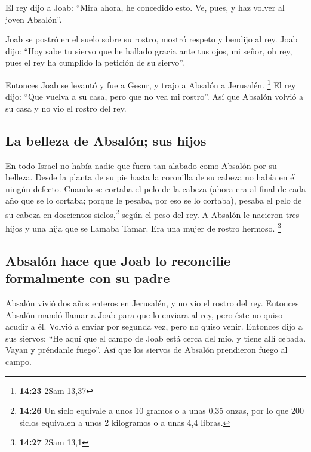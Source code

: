\begin{paracol}{2}
 El rey dijo a Joab: ``Mira ahora, he concedido esto. Ve,
pues, y haz volver al joven Absalón''.

 Joab se postró en el suelo sobre su rostro, mostró
respeto y bendijo al rey. Joab dijo: ``Hoy sabe tu siervo que he hallado
gracia ante tus ojos, mi señor, oh rey, pues el rey ha cumplido la
petición de su siervo''.

 Entonces Joab se levantó y fue a Gesur, y trajo a
Absalón a Jerusalén. \footnote{\textbf{14:23} 2Sam 13,37}
 El rey dijo: ``Que vuelva a su casa, pero que no vea mi
rostro''. Así que Absalón volvió a su casa y no vio el rostro del rey.

\hypertarget{la-belleza-de-absaluxf3n-sus-hijos}{%
\subsection{La belleza de Absalón; sus
hijos}\label{la-belleza-de-absaluxf3n-sus-hijos}}

 En todo Israel no había nadie que fuera tan alabado como
Absalón por su belleza. Desde la planta de su pie hasta la coronilla de
su cabeza no había en él ningún defecto.  Cuando se
cortaba el pelo de la cabeza (ahora era al final de cada año que se lo
cortaba; porque le pesaba, por eso se lo cortaba), pesaba el pelo de su
cabeza en doscientos siclos,\footnote{\textbf{14:26} Un siclo equivale a
  unos 10 gramos o a unas 0,35 onzas, por lo que 200 siclos equivalen a
  unos 2 kilogramos o a unas 4,4 libras.} según el peso del rey.
 A Absalón le nacieron tres hijos y una hija que se
llamaba Tamar. Era una mujer de rostro hermoso. \footnote{\textbf{14:27}
  2Sam 13,1}

\hypertarget{absaluxf3n-hace-que-joab-lo-reconcilie-formalmente-con-su-padre}{%
\subsection{Absalón hace que Joab lo reconcilie formalmente con su
padre}\label{absaluxf3n-hace-que-joab-lo-reconcilie-formalmente-con-su-padre}}

 Absalón vivió dos años enteros en Jerusalén, y no vio el
rostro del rey.  Entonces Absalón mandó llamar a Joab
para que lo enviara al rey, pero éste no quiso acudir a él. Volvió a
enviar por segunda vez, pero no quiso venir.  Entonces
dijo a sus siervos: ``He aquí que el campo de Joab está cerca del mío, y
tiene allí cebada. Vayan y préndanle fuego''. Así que los siervos de
Absalón prendieron fuego al campo.


\end{paracol}
